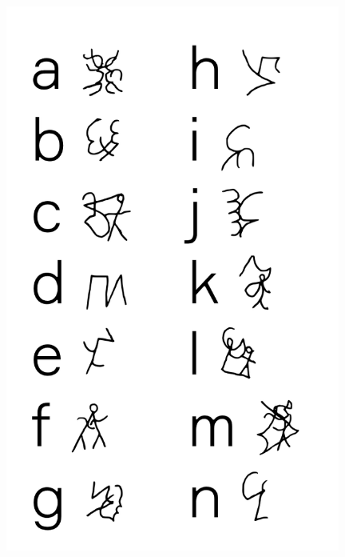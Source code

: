 \pagebreak

\pagestyle{empty}

\makeatletter\@openrightfalse
\movetoevenpage
\begin{absolutelynopagebreak}
\begin{vplace}
\begin{figure}[H]
\begin{adjustwidth}{-0.99cm}{}
  \centering
  \vspace*{-2cm}
  \hspace*{0.4cm}
  \includegraphics[width=110mm]{./imgs/alfa1.pdf}  
  \hfill
\end{adjustwidth}

\thispagestyle{empty}

\end{figure}
\end{vplace}

\end{absolutelynopagebreak}

